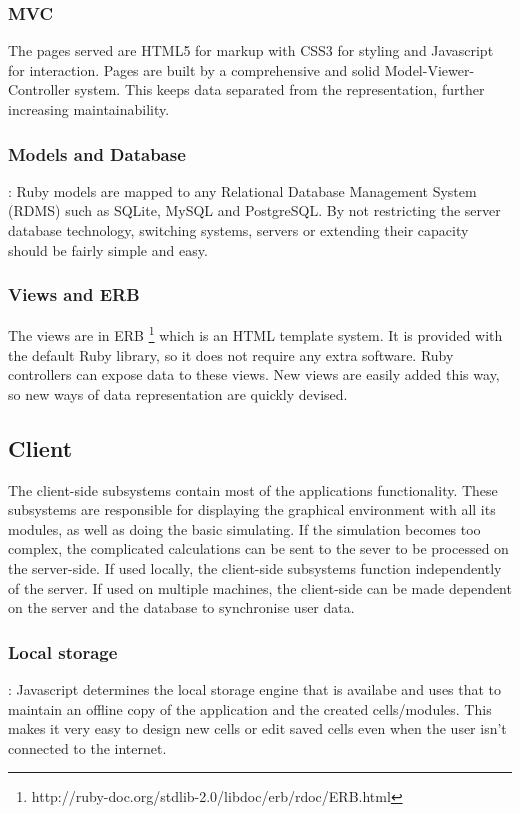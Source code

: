\documentclass{report}
\begin{document}
				\subsubsection{MVC}
					The pages served are HTML5 for markup with CSS3 for styling and Javascript for interaction. Pages are built by a comprehensive and solid Model-Viewer-Controller system. This keeps data separated from the representation, further increasing maintainability.					 
				\subsubsection{Models and Database}
					: Ruby models are mapped to any Relational Database Management System (RDMS) such as SQLite, MySQL and PostgreSQL. By not restricting the server database technology, switching systems, servers or extending  their capacity should be fairly simple and easy.
				\subsubsection{Views and ERB} 
					The views are in ERB \footnote{http://ruby-doc.org/stdlib-2.0/libdoc/erb/rdoc/ERB.html} which is an HTML template system. It is provided with the default Ruby library, so it does not require any extra software. Ruby controllers can expose data to these views. New views are easily added this way, so new ways of data representation are quickly devised.
			\newpage

			\subsection{Client}
				The client-side subsystems contain most of the applications functionality. These subsystems are responsible for displaying the graphical environment with all its modules, as well as doing the basic simulating. If the simulation becomes too complex, the complicated calculations can be sent to the sever to be processed on the server-side. If used locally, the client-side subsystems function independently of the server. If used on multiple machines, the client-side can be made dependent on the server and the database to synchronise user data.
				\subsubsection{Local storage}
					: Javascript determines the local storage engine that is availabe and uses that to maintain an offline copy of the application and the created cells/modules. This makes it very easy to design new cells or edit saved cells even when the user isn't connected to the internet.
\end{document}
